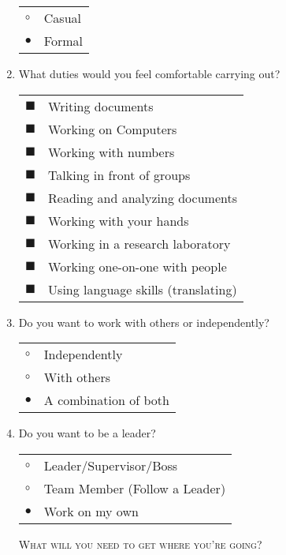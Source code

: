 \documentclass{article}
\begin{document}
\begin{enumerate}
\begin{tabular}{l l}
    $\circ$ & Casual\\
    $\bullet$  & Formal\\
\end{tabular}

\item What duties would you feel comfortable carrying out?  \\

\begin{tabular}{l l}
    $\blacksquare$ & Writing documents\\
    $\blacksquare$ & Working on Computers\\
    $\blacksquare$ & Working with numbers\\
    $\blacksquare$ & Talking in front of groups\\
    $\blacksquare$ & Reading and analyzing documents\\
    $\blacksquare$ & Working with your hands\\
    $\blacksquare$ & Working in a research laboratory\\
    $\blacksquare$ & Working one-on-one with people\\
    $\blacksquare$ & Using language skills (translating)\\
\end{tabular}


\item Do you want to work with others or independently?\\

\begin{tabular}{l l}
    $\circ$ & Independently\\
    $\circ$ & With others\\
    $\bullet$ & A combination of both\\
\end{tabular}

\item Do you want to be a leader?\\

\begin{tabular}{l l}
    $\circ$ & Leader/Supervisor/Boss\\
    $\circ$ & Team Member (Follow a Leader)\\
    $\bullet$ & Work on my own\\
\end{tabular}

\textsc{What will you need to get where you're going?}


\end{enumerate}
\end{document}
